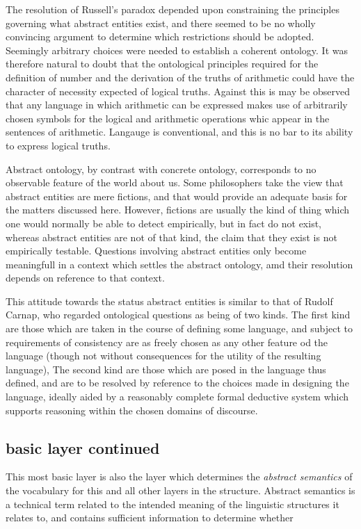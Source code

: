 \documentclass[10pt,titlepage]{article}
\begin{document}
The resolution of Russell's paradox depended upon constraining the principles governing what abstract entities exist, and there seemed to be no wholly convincing argument to determine which restrictions should be adopted.
Seemingly arbitrary choices were needed to establish a coherent ontology.
It was therefore natural to doubt that the ontological principles required for the definition of number and the derivation of the truths of arithmetic could have the character of necessity expected of logical truths.
Against this is may be observed that any language in which arithmetic can be expressed makes use of arbitrarily chosen symbols for the logical and arithmetic operations whic appear in the sentences of arithmetic.
Langauge is conventional, and this is no bar to its ability to express logical truths.

Abstract ontology, by contrast with concrete ontology, corresponds to no observable feature of the world about us.
Some philosophers take the view that abstract entities are mere fictions, and that would provide an adequate basis for the matters discussed here.
However, fictions are usually the kind of thing which one would normally be able to detect empirically, but in fact do not exist, whereas abstract entities are not of that kind, the claim that they exist is not empirically testable.
Questions involving abstract entities only become meaningfull in a context which settles the abstract ontology, amd their resolution depends on reference to that context.

This attitude towards the status abstract entities is similar to that of Rudolf Carnap, who regarded ontological questions as being of two kinds.
The first kind are those which are taken in the course of defining some language, and subject to requirements of consistency are as freely chosen as any other feature od the language (though not without consequences for the utility of the resulting language),
The second kind are those which are posed in the language thus defined, and are to be resolved by reference to the choices made in designing the language, ideally aided by a reasonably complete formal deductive system which supports reasoning within the chosen domains of discourse.

\subsection{basic layer continued}

This most basic layer is also the layer which determines the \emph{abstract semantics} of the vocabulary for this and all other layers in the structure.
Abstract semantics is a technical term related to the intended meaning of the linguistic structures it relates to, and contains sufficient information to determine whether
\end{document}

